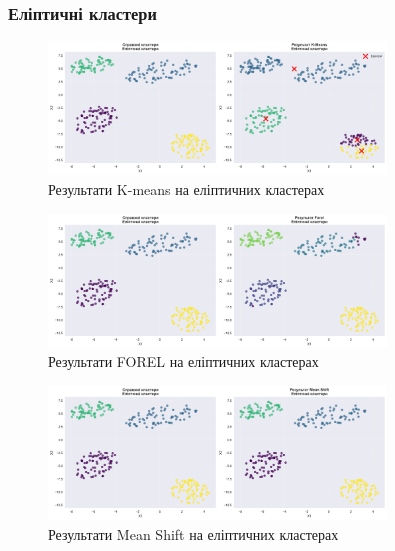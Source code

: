 \documentclass[12pt,a4paper]{article}
\begin{document}
\subsubsection{Еліптичні кластери}

\begin{figure}[H]
\centering
\includegraphics[width=0.8\textwidth]{clustering_visualizations/K-means_Еліптичні_кластери_results.png}
\caption{Результати K-means на еліптичних кластерах}
\label{fig:kmeans_elliptical}
\end{figure}

\begin{figure}[H]
\centering
\includegraphics[width=0.8\textwidth]{clustering_visualizations/FOREL_Еліптичні_кластери_results.png}
\caption{Результати FOREL на еліптичних кластерах}
\label{fig:forel_elliptical}
\end{figure}

\begin{figure}[H]
\centering
\includegraphics[width=0.8\textwidth]{clustering_visualizations/Mean Shift_Еліптичні_кластери_results.png}
\caption{Результати Mean Shift на еліптичних кластерах}
\label{fig:meanshift_elliptical}
\end{figure}
\end{document}
